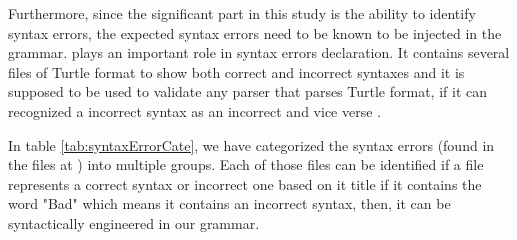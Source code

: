  Furthermore, since the significant part in this study is the ability to identify syntax errors, the expected syntax errors need to be known to be injected in the grammar. \cite{TurtleTests:Online} plays an important role in syntax errors declaration. It contains several files of Turtle format to show both correct and incorrect syntaxes and it is supposed to be used to validate any parser that parses Turtle format, if it can recognized a incorrect syntax as an incorrect and vice verse . 
 
 In table \ref{tab:syntaxErrorCate}, we have categorized the syntax errors (found in the files at \cite{TurtleTests:Online}) into multiple groups. Each of those files can be identified if a file represents a correct syntax or incorrect one based on it title if it contains the word "Bad" which means it contains an incorrect syntax, then, it can be syntactically engineered in our grammar.  
 

